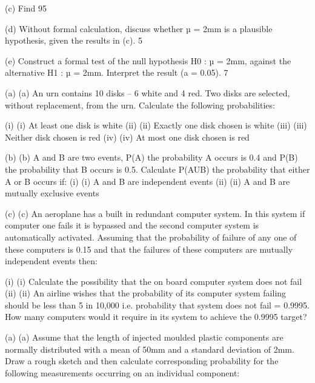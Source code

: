 (c) Find 95%
 
(d) Without formal calculation, discuss whether µ = 2mm is a plausible  hypothesis,   given the results in (c). 						5
 
(e) Construct a formal test of the null hypothesis H0 : µ = 2mm, against the alternative  H1 : µ = 2mm. Interpret the result (a = 0.05).			7 										
 
 


(a)	(a)    An urn contains 10 disks – 6 white and 4 red.  Two disks are selected, without replacement, from the urn.  Calculate the following probabilities:
 
(i)	(i)                  At least one disk is white
(ii)	(ii)                Exactly one disk chosen is white
(iii)	(iii)               Neither disk chosen is red
(iv)	(iv)              At most one disk chosen is red

 
(b)	(b)   A and B are two events, P(A)  the probability A occurs is 0.4 and P(B) the probability that B occurs is 0.5.  Calculate P(AUB) the probability that either A or B occurs if:
(i)	(i)                  A and B are independent events
(ii)	(ii)                A and B are mutually exclusive events


(c)	(c)    An aeroplane has a built in redundant computer system.  In this system if computer one fails it is bypassed and the second computer system is automatically activated.  Assuming that the probability of failure of any one of these computers is 0.15 and that the failures of these computers are mutually independent events then:
 
(i)	(i)                  Calculate the possibility that the on board computer system does not fail
(ii)	(ii)                An airline wishes that the probability of its computer system failing should be less than 5 in 10,000 i.e. probability that system does not fail = 0.9995.  How many computers would it require in its system to achieve the 0.9995 target?
 
 
 

(a)	(a)    Assume that the length of injected moulded plastic components are normally distributed with a mean of 50mm and a standard deviation of 2mm.  Draw a rough sketch and then calculate corresponding probability for the following measurements occurring on an individual component:
 
